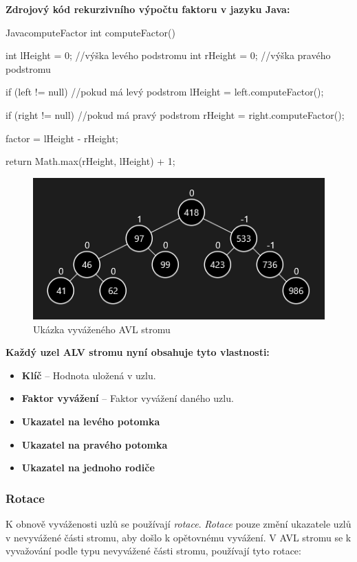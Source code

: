 \documentclass[
  biblatex=false,
  font=serif,
  glossaries=false,
  tables=false,
  theorems=false,
  index
]{kidiplom}
\begin{document}
\newpage\noindent \textbf{Zdrojový kód rekurzivního výpočtu faktoru v jazyku Java:}

\begin{kicode}{Java}{}{computeFactor}
int computeFactor() {		
	int lHeight = 0; //výška levého podstromu
	int rHeight = 0; //výška pravého podstromu
		
	if (left != null) { //pokud má levý podstrom
		lHeight = left.computeFactor();
	}
		
	if (right != null) { //pokud má pravý podstrom
		rHeight = right.computeFactor();
	}		
		
	factor = lHeight - rHeight; 
		
	return Math.max(rHeight, lHeight) + 1;		
}
\end{kicode} 

\begin{figure}[h!]
\centering
	\includegraphics[scale=1]{obrazky/10AVLUkazka.png}
	\caption{Ukázka vyváženého AVL stromu}
\end{figure}


\noindent\textbf{Každý uzel ALV stromu nyní obsahuje tyto vlastnosti:}
\begin{itemize}
\item \textbf{Klíč} -- Hodnota uložená v uzlu.
\item \textbf{Faktor vyvážení} -- Faktor vyvážení daného uzlu.
\item \textbf{Ukazatel na levého potomka}
\item \textbf{Ukazatel na pravého potomka}
\item \textbf{Ukazatel na jednoho rodiče}
\end{itemize}

\subsubsection{Rotace}
\indent\indent K obnově vyváženosti uzlů se používají \textit{rotace}. \textit{Rotace} pouze změní ukazatele uzlů v nevyvážené části stromu, aby došlo k opětovnému vyvážení. V AVL stromu se k vyvažování podle typu nevyvážené části stromu, používají tyto rotace:\\
\end{document}
